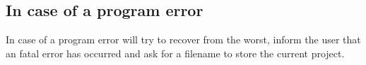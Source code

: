 \subsection{In case of a program error}%
\label{basic.error}

In case of a program error \period will try to recover from the
worst, inform the user that an fatal error has occurred and ask for a
filename to store the current project.


